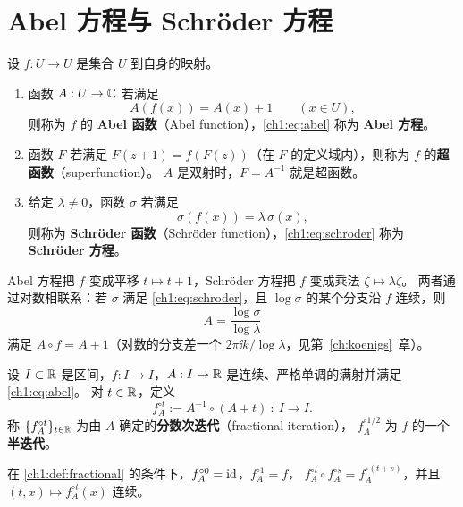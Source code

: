 \section{Abel 方程与 Schröder 方程}\label{ch1:sec:abel}

\begin{definition}\label{ch1:def:abel}
设 $f:U\to U$ 是集合 $U$ 到自身的映射。
\begin{enumerate}[label=(\alph*)]
\item 函数 $A:U\to\mathbb{C}$ 若满足
  \begin{equation}\label{ch1:eq:abel}
    A(f(x))=A(x)+1\qquad(x\in U),
  \end{equation}
  则称为 $f$ 的 \textbf{Abel 函数}（Abel function），\eqref{ch1:eq:abel} 称为 \textbf{Abel 方程}。
\item 函数 $F$ 若满足 $F(z+1)=f(F(z))$（在 $F$ 的定义域内），则称为 $f$ 的\textbf{超函数}（superfunction）。
  $A$ 是双射时，$F=A^{-1}$ 就是超函数。
\item 给定 $\lambda\ne0$，函数 $\sigma$ 若满足
  \begin{equation}\label{ch1:eq:schroder}
    \sigma(f(x))=\lambda\,\sigma(x),
  \end{equation}
  则称为 \textbf{Schröder 函数}（Schröder function），\eqref{ch1:eq:schroder} 称为 \textbf{Schröder 方程}。
\end{enumerate}
\end{definition}

Abel 方程把 $f$ 变成平移 $t\mapsto t+1$，Schröder 方程把 $f$ 变成乘法 $\zeta\mapsto\lambda\zeta$。
两者通过对数相联系：若 $\sigma$ 满足 \eqref{ch1:eq:schroder}，且 $\log\sigma$ 的某个分支沿 $f$ 连续，则
\begin{equation}\label{ch1:eq:abel-from-schroder}
  A=\frac{\log\sigma}{\log\lambda}
\end{equation}
满足 $A\circ f=A+1$（对数的分支差一个 $2\pi\ii k/\log\lambda$，见第~\ref{ch:koenigs}~章）。

\begin{definition}[分数次迭代]\label{ch1:def:fractional}
设 $I\subset\mathbb{R}$ 是区间，$f:I\to I$，$A:I\to\mathbb{R}$ 是连续、严格单调的满射并满足 \eqref{ch1:eq:abel}。
对 $t\in\mathbb{R}$，定义
\[
  f_A^{\circ t}:=A^{-1}\circ(A+t)\ :\ I\to I .
\]
称 $\{f_A^{\circ t}\}_{t\in\mathbb{R}}$ 为由 $A$ 确定的\textbf{分数次迭代}（fractional iteration），
$f_A^{\circ1/2}$ 为 $f$ 的一个\textbf{半迭代}。
\end{definition}

\begin{proposition}\label{ch1:prop:flow}
在 \cref{ch1:def:fractional} 的条件下，$f_A^{\circ0}=\mathrm{id}$，$f_A^{\circ1}=f$，
$f_A^{\circ t}\circ f_A^{\circ s}=f_A^{\circ(t+s)}$，并且 $(t,x)\mapsto f_A^{\circ t}(x)$ 连续。
\end{proposition}

